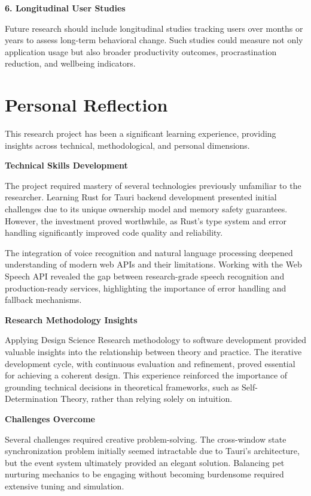 \textbf{6. Longitudinal User Studies}

Future research should include longitudinal studies tracking users over months or years to assess long-term behavioral change. Such studies could measure not only application usage but also broader productivity outcomes, procrastination reduction, and wellbeing indicators.

\section{Personal Reflection}
\label{sec:personal-reflection}

\completed

This research project has been a significant learning experience, providing insights across technical, methodological, and personal dimensions.

\textbf{Technical Skills Development}

The project required mastery of several technologies previously unfamiliar to the researcher. Learning Rust for Tauri backend development presented initial challenges due to its unique ownership model and memory safety guarantees. However, the investment proved worthwhile, as Rust's type system and error handling significantly improved code quality and reliability.

The integration of voice recognition and natural language processing deepened understanding of modern web APIs and their limitations. Working with the Web Speech API revealed the gap between research-grade speech recognition and production-ready services, highlighting the importance of error handling and fallback mechanisms.

\textbf{Research Methodology Insights}

Applying Design Science Research methodology to software development provided valuable insights into the relationship between theory and practice. The iterative development cycle, with continuous evaluation and refinement, proved essential for achieving a coherent design. This experience reinforced the importance of grounding technical decisions in theoretical frameworks, such as Self-Determination Theory, rather than relying solely on intuition.

\textbf{Challenges Overcome}

Several challenges required creative problem-solving. The cross-window state synchronization problem initially seemed intractable due to Tauri's architecture, but the event system ultimately provided an elegant solution. Balancing pet nurturing mechanics to be engaging without becoming burdensome required extensive tuning and simulation.


